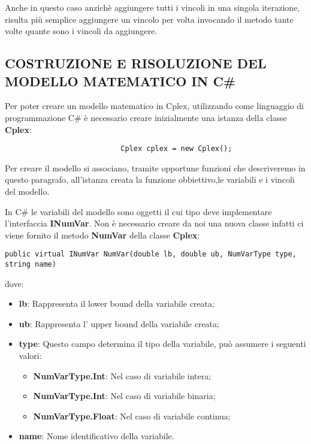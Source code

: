 \documentclass[11pt]{article}
\begin{document}
Anche in questo caso anzichè aggiungere tutti i vincoli in una singola iterazione, risulta più semplice aggiungere un vincolo per volta invocando il metodo tante volte quante sono i vincoli da aggiungere.

\subsection*{COSTRUZIONE E RISOLUZIONE DEL MODELLO MATEMATICO IN C\#}
\label{sec:ModelloCSS}

Per poter creare un modello matematico in Cplex, utilizzando come linguaggio di programmazione C\# è necessario creare inizialmente una istanza della classe \textbf{Cplex}:

\begin{lstlisting}
                           Cplex cplex = new Cplex();
\end{lstlisting}

Per creare il modello si associano, tramite opportune funzioni che descriveremo in questo paragrafo, all'istanza creata la funzione obbiettivo,le variabili e i vincoli del modello. 

In C\# le variabili del modello sono oggetti il cui tipo deve implementare l'interfaccia \textbf{INumVar}. Non è necessario creare da noi una nuova classe infatti ci viene fornito il metodo \textbf{NumVar} della classe \textbf{Cplex}:

\begin{lstlisting}
public virtual INumVar NumVar(double lb, double ub, NumVarType type, string name)
\end{lstlisting}

dove:

\begin{itemize}
\item \textbf{lb}: Rappresenta il lower bound della variabile creata;
\item \textbf{ub}: Rappresenta l' upper bound della variabile creata;
\item \textbf{type}: Questo campo determina il tipo della variabile, può assumere i seguenti valori:
\begin{itemize}
\item \textbf{NumVarType.Int}: Nel caso di variabile intera;
\item \textbf{NumVarType.Int}: Nel caso di variabile binaria;
\item \textbf{NumVarType.Float}: Nel caso di variabile continua;
\end{itemize}
\item \textbf{name}: Nome identificativo della variabile.
\end{itemize}
\end{document}
